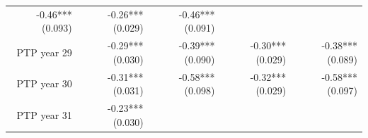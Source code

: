 \documentclass[]{article}
\begin{document}
\begin{longtable}[c]{@{}rrrrr@{}}
\begin{minipage}[t]{0.16\columnwidth}
-0.46*** (0.093)
\strut\end{minipage} &
\begin{minipage}[t]{0.21\columnwidth}\raggedleft\strut
-0.26*** (0.029)
\strut\end{minipage} &
\begin{minipage}[t]{0.15\columnwidth}\raggedleft\strut
-0.46*** (0.091)
\strut\end{minipage}\tabularnewline
\begin{minipage}[t]{0.17\columnwidth}\raggedleft\strut
PTP year 29
\strut\end{minipage} &
\begin{minipage}[t]{0.18\columnwidth}\raggedleft\strut
-0.29*** (0.030)
\strut\end{minipage} &
\begin{minipage}[t]{0.16\columnwidth}\raggedleft\strut
-0.39*** (0.090)
\strut\end{minipage} &
\begin{minipage}[t]{0.21\columnwidth}\raggedleft\strut
-0.30*** (0.029)
\strut\end{minipage} &
\begin{minipage}[t]{0.15\columnwidth}\raggedleft\strut
-0.38*** (0.089)
\strut\end{minipage}\tabularnewline
\begin{minipage}[t]{0.17\columnwidth}\raggedleft\strut
PTP year 30
\strut\end{minipage} &
\begin{minipage}[t]{0.18\columnwidth}\raggedleft\strut
-0.31*** (0.031)
\strut\end{minipage} &
\begin{minipage}[t]{0.16\columnwidth}\raggedleft\strut
-0.58*** (0.098)
\strut\end{minipage} &
\begin{minipage}[t]{0.21\columnwidth}\raggedleft\strut
-0.32*** (0.029)
\strut\end{minipage} &
\begin{minipage}[t]{0.15\columnwidth}\raggedleft\strut
-0.58*** (0.097)
\strut\end{minipage}\tabularnewline
\begin{minipage}[t]{0.17\columnwidth}\raggedleft\strut
PTP year 31
\strut\end{minipage} &
\begin{minipage}[t]{0.18\columnwidth}\raggedleft\strut
-0.23*** (0.030)
\strut\end{minipage} &
\begin{minipage}[t]{0.16\columnwidth}\raggedleft\strut

\end{minipage}
\end{longtable}
\end{document}
